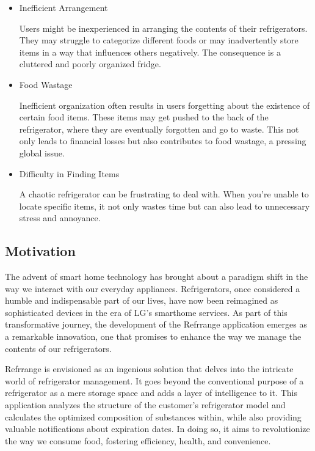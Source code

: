\documentclass[conference]{IEEEtran}
\begin{document}
\begin{itemize}
    \item Inefficient Arrangement\par
    Users might be inexperienced in arranging the contents of their refrigerators. They may struggle to categorize different foods or may inadvertently store items in a way that influences others negatively. The consequence is a cluttered and poorly organized fridge.    
    \item Food Wastage\par
    Inefficient organization often results in users forgetting about the existence of certain food items. These items may get pushed to the back of the refrigerator, where they are eventually forgotten and go to waste. This not only leads to financial losses but also contributes to food wastage, a pressing global issue.    
    \item Difficulty in Finding Items\par
    A chaotic refrigerator can be frustrating to deal with. When you're unable to locate specific items, it not only wastes time but can also lead to unnecessary stress and annoyance.
\end{itemize}

\subsection{Motivation}

The advent of smart home technology has brought about a paradigm shift in the way we interact with our everyday appliances. Refrigerators, once considered a humble and indispensable part of our lives, have now been reimagined as sophisticated devices in the era of LG's smarthome services. As part of this transformative journey, the development of the Refrrange application emerges as a remarkable innovation, one that promises to enhance the way we manage the contents of our refrigerators.

Refrrange is envisioned as an ingenious solution that delves into the intricate world of refrigerator management. It goes beyond the conventional purpose of a refrigerator as a mere storage space and adds a layer of intelligence to it. This application analyzes the structure of the customer's refrigerator model and calculates the optimized composition of substances within, while also providing valuable notifications about expiration dates. In doing so, it aims to revolutionize the way we consume food, fostering efficiency, health, and convenience.
\end{document}
